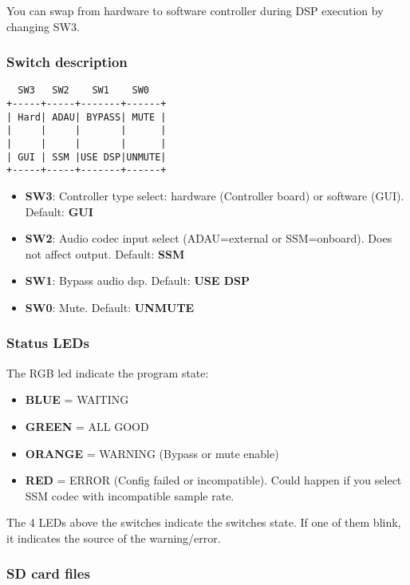 You can swap from hardware to software controller during DSP execution
by changing SW3.

\hypertarget{switch-description}{%
\subsubsection{Switch description}\label{switch-description}}

\begin{verbatim}
  SW3   SW2    SW1    SW0
+-----+-----+-------+------+
| Hard| ADAU| BYPASS| MUTE |
|     |     |       |      |
|     |     |       |      |
| GUI | SSM |USE DSP|UNMUTE|
+-----+-----+-------+------+
\end{verbatim}
\begin{itemize}

\item
  \textbf{SW3}: Controller type select: hardware (Controller board) or
  software (GUI). Default: {\bf GUI}
\item
  \textbf{SW2}: Audio codec input select (ADAU=external or SSM=onboard).
  Does not affect output. Default: \textbf{SSM}
\item
  \textbf{SW1}: Bypass audio dsp. Default: \textbf{USE DSP}
\item
  \textbf{SW0}: Mute. Default: \textbf{UNMUTE}
\end{itemize}

\hypertarget{status-leds}{%
\subsubsection{Status LEDs}\label{status-leds}}

The RGB led indicate the program state:

\begin{itemize}

\item
  \textbf{BLUE} = WAITING
\item
  \textbf{GREEN} = ALL GOOD
\item
  \textbf{ORANGE} = WARNING (Bypass or mute enable)
\item
  \textbf{RED} = ERROR (Config failed or incompatible). Could happen if
  you select SSM codec with incompatible sample rate.
\end{itemize}

The 4 LEDs above the switches indicate the switches state. If one of
them blink, it indicates the source of the warning/error.

\hypertarget{sd-card-files}{%
\subsubsection{SD card files}\label{sd-card-files}}

